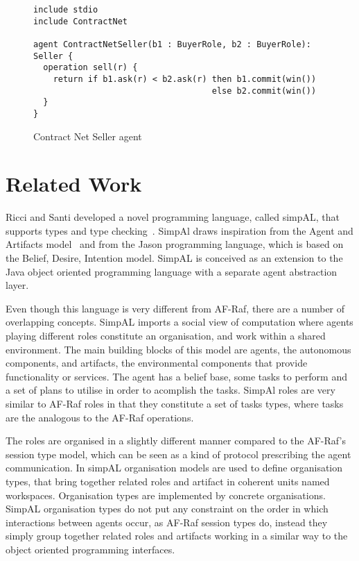 \documentclass[a4paper,12pt,oneside,fleqn]{book} %
\begin{document}
\begin{figure}\footnotesize %
\begin{verbatim}
include stdio
include ContractNet

agent ContractNetSeller(b1 : BuyerRole, b2 : BuyerRole): Seller {
  operation sell(r) {
    return if b1.ask(r) < b2.ask(r) then b1.commit(win()) 
                                    else b2.commit(win())
  }
}
\end{verbatim}
\caption{Contract Net Seller agent}
\label{fig:contract-seller}
\end{figure} %


\chapter{Related Work}\label{ch:related} %


Ricci  and Santi developed a novel programming language, called simpAL, that
supports types and type checking~\cite{DBLP:conf/promas/RicciS12}. SimpAl
draws inspiration from the Agent and Artifacts
model~\cite{DBLP:conf/atal/RicciVO07} and from the Jason programming
language, which is based on the Belief, Desire, Intention model. SimpAL is
conceived as an extension to the Java object oriented programming language
with a separate agent abstraction layer.

Even though this language is very different from AF-Raf, there are a
number of overlapping concepts. SimpAL imports a social view of computation
where agents playing different roles constitute an organisation, and work
within a shared environment. The main building blocks of this model are
agents, the autonomous components, and artifacts, the environmental
components that provide functionality or services. The agent has a belief
base, some tasks to perform and a set of plans to utilise in order to
acomplish the tasks. SimpAl roles are very similar to AF-Raf roles in that
they constitute a set of tasks types, where tasks are the analogous to the
AF-Raf operations.

The roles are organised in a slightly different manner compared to the
AF-Raf's session type model, which can be seen as a kind of protocol
prescribing the agent communication. In simpAL organisation models are used
to define organisation types, that bring together related roles and
artifact in coherent units named workspaces. Organisation types are
implemented by concrete organisations. SimpAL organisation types do not put
any constraint on the order in which interactions between agents occur, as
AF-Raf session types do, instead they simply group together related roles
and artifacts working in a similar way to the object oriented programming
interfaces.
\end{document}
